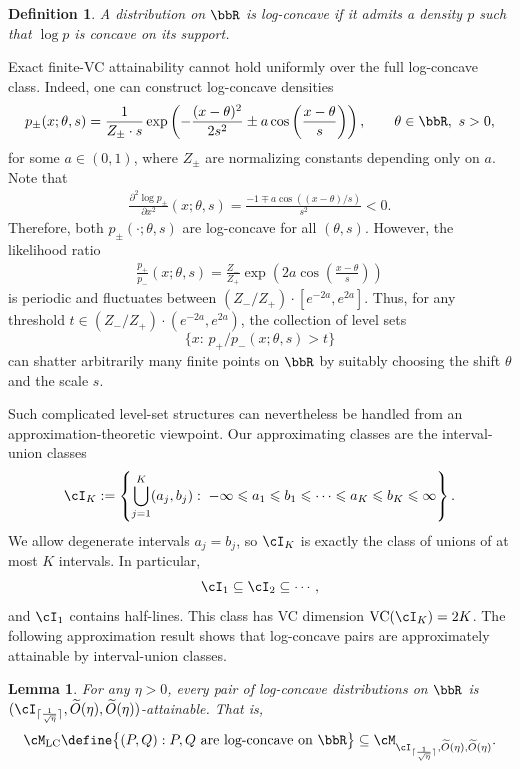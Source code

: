 \documentclass[english]{article}
\theoremstyle{plain}
\newtheorem{lemma}{Lemma}[section]
\newtheorem{definition}{Definition}[section]
\theoremstyle{definition}
\begin{document}
\begin{definition}
A distribution on \(\bbR\) is \emph{log-concave} if it admits a density \(p\)
such that \(\log p\) is concave on its support.
\end{definition}


Exact finite-VC attainability cannot hold uniformly over the full log-concave
class. Indeed, one can construct log-concave densities
\begin{align*}
p_\pm(x;\theta,s)
=
\frac{1}{Z_\pm\cdot s}
\exp\left(-\frac{(x-\theta)^2}{2s^2}\pm a\cos\left(\frac{x-\theta}{s}\right)\right),
\qquad
\theta\in\bbR,\ s>0,
\end{align*}
for some \(a\in(0,1)\), where \(Z_\pm\) are normalizing constants depending
only on \(a\). Note that
\begin{align*}
\frac{\partial^2\log p_\pm}{\partial x^2}(x;\theta,s)
=
\frac{-1\mp a\cos((x-\theta)/s)}{s^2}
<0.
\end{align*}
Therefore, both \(p_\pm(\cdot;\theta,s)\) are log-concave for all
\((\theta,s)\). However, the likelihood ratio
\begin{align*}
\frac{ p_+}{p_-}(x;\theta,s)
=
\frac{Z_-}{Z_+}\exp\left(2a\cos\left(\frac{x-\theta}{s}\right)\right)
\end{align*}
is periodic and fluctuates between
\((Z_-/Z_+)\cdot [e^{-2a},e^{2a}]\). Thus, for any threshold
\(t\in(Z_-/Z_+)\cdot (e^{-2a},e^{2a})\), the collection of level sets
\[
\{x:\, p_+/ p_-(x;\theta,s)>t\}
\]
can shatter arbitrarily many finite points on \(\bbR\) by suitably choosing
the shift \(\theta\) and the scale \(s\).

Such complicated level-set structures can nevertheless be handled from an
approximation-theoretic viewpoint. Our approximating classes are the
interval-union classes
\begin{align}\label{eq:union-interval}
   \cI_K
:=
\left\{
\bigcup_{j=1}^K (a_j,b_j)
:\;
-\infty \leqslant a_1 \leqslant b_1 \leqslant \cdots \leqslant a_K \leqslant b_K \leqslant \infty
\right\}. 
\end{align}
We allow degenerate intervals $a_j=b_j$, so $\cI_K$ is exactly the class of
unions of at most $K$ intervals. In particular,
\[
\cI_1 \subseteq \cI_2 \subseteq \cdots,
\]
and $\cI_1$ contains half-lines. 
This class has VC dimension $\mathrm{VC}(\cI_K)=2K$.
The following approximation result shows that log-concave pairs are
approximately attainable by interval-union classes.

\begin{lemma}\label{lem:log-concave-approx-attain}
For any \(\eta>0\), every pair of log-concave distributions on \(\bbR\) is
\((\cI_{\lceil \frac{1}{\sqrt{\eta}}\rceil}, \widetilde{O}(\eta), \widetilde{O}(\eta))\)-attainable. That is,
\[
\cM_{\mathrm{LC}}
\define
\big\{(P,Q): P,Q \text{ are log-concave on } \bbR\big\}
\subseteq
\cM_{\cI_{\lceil \frac{1}{\sqrt{\eta}}\rceil}, \widetilde{O}(\eta), \widetilde{O}(\eta)}.
\]
\end{lemma}
\end{document}
